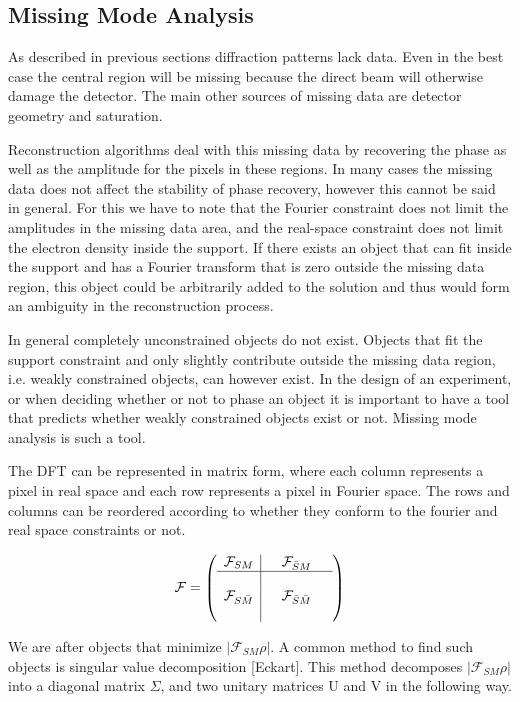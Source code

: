 \subsection{Missing Mode Analysis}
As described in previous sections diffraction patterns lack data. Even in the best case the central region will be missing because the direct beam will otherwise damage the detector. The main other sources of missing data are detector geometry and saturation. 

Reconstruction algorithms deal with this missing data by recovering the phase as well as the amplitude for the pixels in these regions. In many cases the missing data does not affect the stability of phase recovery, however this cannot be said in general. For this we have to note that the Fourier constraint does not limit the amplitudes in the missing data area, and the real-space constraint does not limit the electron density inside the support. If there exists an object that can fit inside the support and has a Fourier transform that is zero outside the missing data region, this object could be arbitrarily added to the solution and thus would form an ambiguity in the reconstruction process.

In general completely unconstrained objects do not exist. Objects that fit the support constraint and only slightly contribute outside the missing data region, i.e. weakly constrained objects, can however exist. In the design of an experiment, or when deciding whether or not to phase an object it is important to have a tool that predicts whether weakly constrained objects exist or not. Missing mode analysis is such a tool.

The DFT can be represented in matrix form, where each column represents a pixel in real space and each row represents a pixel in Fourier space. The rows and columns can be reordered according to whether they conform to the fourier and real space constraints or not.

\begin{equation}\label{equ:F_split}
  \mathcal{F} = 
  \left(\begin{array}{l|lll}
    \mathcal{F}_{SM} & &\mathcal{F}_{\bar{S}M}& \\\hline
    &&&\\
    \mathcal{F}_{S\bar{M}} & & \mathcal{F}_{\bar{S}\bar{M}} &\\
    &&&
  \end{array}\right)
\end{equation}

We are after objects that minimize $|\mathcal{F}_{SM}\rho|$. A common method to find such objects is singular value decomposition [Eckart]. This method decomposes $|\mathcal{F}_{SM}\rho|$ into a diagonal matrix $\Sigma$, and two unitary matrices U and V in the following way.


